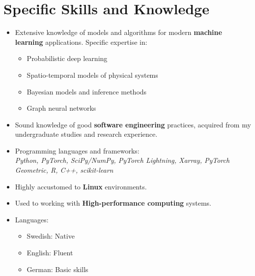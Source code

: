 \section*{Specific Skills and Knowledge}
\begin{itemize}
    \item Extensive knowledge of models and algorithms for modern \textbf{machine learning} applications. Specific expertise in:
    \begin{itemize}
        \item Probabilistic deep learning
        \item Spatio-temporal models of physical systems
        \item Bayesian models and inference methods
        \item Graph neural networks
    \end{itemize}

    \item Sound knowledge of good \textbf{software engineering} practices, acquired from my undergraduate studies and research experience.

    \item Programming languages and frameworks:\\
    \textit{Python, PyTorch, SciPy/NumPy, PyTorch Lightning, Xarray, PyTorch Geometric, R, C++, scikit-learn}

    \item Highly accustomed to \textbf{Linux} environments.
    \item Used to working with \textbf{High-performance computing} systems.
    \item Languages:
    \begin{itemize}
        \item Swedish: Native
        \item English: Fluent
        \item German: Basic skills
    \end{itemize}
\end{itemize}


